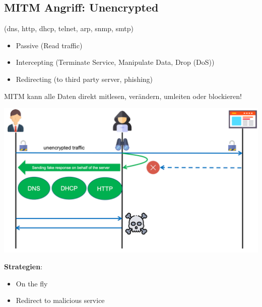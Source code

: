 \subsection{MITM Angriff: Unencrypted}\label{subsec:unencrypted-mitm-attack}
(dns, http, dhcp, telnet, arp, snmp, smtp)
\begin{itemize}
    \item Passive (Read traffic)
    \item Intercepting (Terminate Service, Manipulate Data, Drop (DoS))
    \item Redirecting (to third party server, phishing)
\end{itemize}
MITM kann alle Daten direkt mitlesen, verändern, umleiten oder blockieren!
\begin{center}
    \vspace{-8pt}
    \includegraphics[width=1.0\linewidth]{./img/09-mitm/mitm_unenctypt_2}
    \vspace{-8pt}
\end{center}

\textbf{Strategien}:
\begin{itemize}
    \item On the fly
    \item Redirect to malicious service
\end{itemize}

